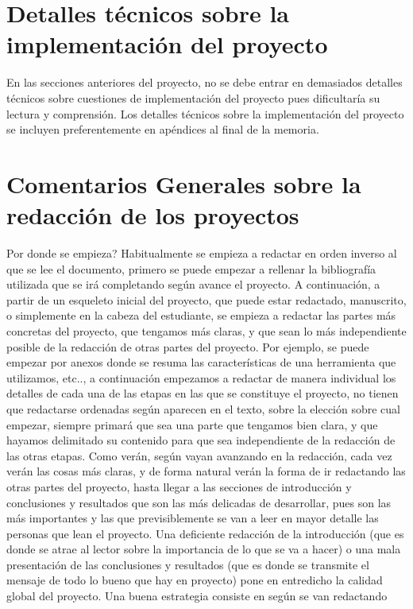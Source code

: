 \documentclass[12pt,a4paper,spanish]{book}
\begin{document}
\chapter[Detalles Implementación]{Detalles técnicos sobre la
implementación del proyecto}
 En las secciones anteriores del proyecto, no se debe entrar en
demasiados detalles técnicos sobre
 cuestiones de implementación del proyecto pues dificultaría su
lectura y comprensión. Los detalles técnicos
 sobre la implementación del proyecto se incluyen
preferentemente en apéndices al final de la memoria.
\chapter[Redacción de Proyectos]{Comentarios Generales sobre la
redacción de los proyectos}
Por donde se empieza? Habitualmente se empieza a redactar en orden
inverso al que se lee el documento, primero
se puede empezar a rellenar la bibliografía utilizada que se irá
completando según avance el proyecto. A continuación,
a partir de un esqueleto inicial del proyecto, que puede estar
redactado, manuscrito, o simplemente en la cabeza del estudiante,
se empieza a redactar las partes más concretas del proyecto, que
tengamos más claras, y que sean lo más independiente posible
de la redacción de otras partes del proyecto. Por ejemplo, se puede
empezar por anexos donde se resuma las características
de una herramienta que utilizamos, etc.., a continuación empezamos a
redactar de manera individual los detalles de cada
una de las etapas en las que se constituye el proyecto, no tienen que
redactarse ordenadas según aparecen en el texto,
sobre la elección sobre cual empezar, siempre primará que sea una
parte que tengamos bien clara, y que hayamos delimitado
su contenido para que sea independiente de la redacción de las otras
etapas. Como verán, según vayan avanzando en la
redacción, cada vez verán las cosas más claras, y de forma natural
verán la forma de ir redactando las otras partes del
proyecto, hasta llegar a las secciones de introducción y conclusiones
y resultados que son las más delicadas de desarrollar,
pues son las más importantes y las que previsiblemente se van a leer
en mayor detalle las personas que lean el proyecto.
Una deficiente redacción de la introducción (que es donde se atrae al
lector sobre la importancia de lo que se va a hacer)
o una mala presentación de las conclusiones y resultados (que es
donde se transmite el mensaje de todo lo bueno que hay
en proyecto) pone en entredicho la calidad global del proyecto. Una
buena estrategia consiste en según se van redactando
\end{document}
